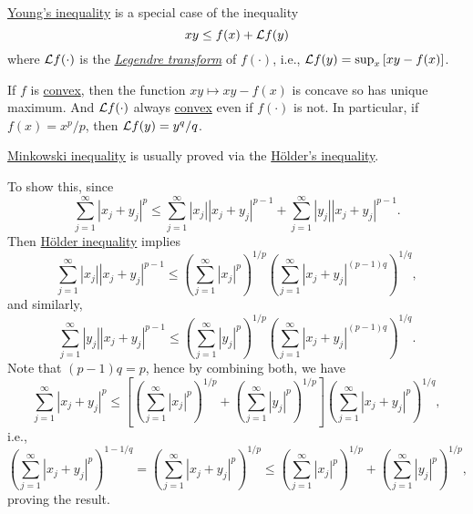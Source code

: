 \begin{remark}
	\href{https://en.wikipedia.org/wiki/Young's_inequality_for_products}{Young's inequality} is a special case of the inequality
	\[
		xy \leq f(x) + \mathcal{\MakeUppercase{l}} f(y)
	\]
	where \(\mathcal{\MakeUppercase{l}} f(\cdot)\) is the \href{https://en.wikipedia.org/wiki/Legendre_transformation}{\emph{Legendre transform}} of \(f(\cdot)\), i.e., \(\mathcal{\MakeUppercase{l}} f(y) = \sup _x \left[ xy - f(x) \right]\).

	If \(f\) is \hyperref[def:convex-function]{convex}, then the function \(xy\mapsto xy - f(x)\) is concave so has unique maximum. And \(\mathcal{\MakeUppercase{l}} f(\cdot)\) always \hyperref[def:convex-function]{convex} even if \(f(\cdot)\) is not. In particular, if \(f(x) = x^p / p\), then \(\mathcal{\MakeUppercase{l}} f(y) = y^q / q\).
\end{remark}

\begin{note}
	\hyperref[lma:Minkowski-ineq]{Minkowski inequality} is usually proved via the \hyperref[lma:Holder-ineq]{Hölder's inequality}.
\end{note}
\begin{explanation}
	To show this, since
	\[
		\sum_{j=1}^{\infty} \left\vert x_j + y_j \right\vert ^p \leq \sum_{j=1}^{\infty} \left\vert x_{j}  \right\vert \left\vert x_{j} +y_{j}  \right\vert ^{p - 1} + \sum_{j=1}^{\infty} \left\vert y_{j}  \right\vert \left\vert x_{j} +y_{j}  \right\vert ^{p-1}.
	\]
	Then \hyperref[lma:Holder-ineq]{Hölder inequality} implies
	\[
		\sum_{j=1}^{\infty} \left\vert x_{j}  \right\vert \left\vert x_{j} + y_{j}  \right\vert ^{p-1}\leq \left( \sum_{j=1}^{\infty} \left\vert x_{j}  \right\vert^p \right) ^{1 / p} \left( \sum_{j=1}^{\infty} \left\vert x_{j} +y_{j}  \right\vert^{(p - 1)q}  \right) ^{1 / q},
	\]
	and similarly,
	\[
		\sum_{j=1}^{\infty} \left\vert y_{j}  \right\vert \left\vert x_{j} + y_{j}  \right\vert ^{p-1}\leq \left( \sum_{j=1}^{\infty} \left\vert y_{j}  \right\vert^p \right) ^{1 / p} \left( \sum_{j=1}^{\infty} \left\vert x_{j} +y_{j}  \right\vert^{(p - 1)q}  \right) ^{1 / q}.
	\]
	Note that \((p-1)q = p\), hence by combining both, we have
	\[
		\sum_{j=1}^{\infty} \left\vert x_j + y_j \right\vert ^p \leq
		\left[ \left( \sum_{j=1}^{\infty} \left\vert x_{j}  \right\vert^p \right) ^{1 / p}
			+ \left( \sum_{j=1}^{\infty} \left\vert y_{j}  \right\vert^p \right) ^{1 / p} \right] \left( \sum_{j=1}^{\infty} \left\vert x_{j} +y_{j}  \right\vert^{p}  \right) ^{1 / q},
	\]
	i.e.,
	\[
		\left( \sum_{j=1}^{\infty} \left\vert x_j + y_j \right\vert ^p \right) ^{1 - 1 / q}
		= \left( \sum_{j=1}^{\infty} \left\vert x_j + y_j \right\vert ^p \right) ^{1 / p}
		\leq
		\left( \sum_{j=1}^{\infty} \left\vert x_{j}  \right\vert^p \right) ^{1 / p}
		+ \left( \sum_{j=1}^{\infty} \left\vert y_{j}  \right\vert^p \right) ^{1 / p},
	\]
	proving the result.
\end{explanation}

